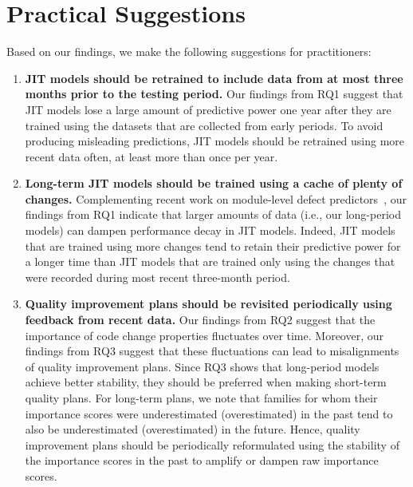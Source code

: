 \section{Practical Suggestions}
\label{sec:practice}

Based on our findings, we make the following suggestions for practitioners:

\begin{enumerate}[{\bf (1)}]
  \item {\bf JIT models should be retrained to include data from at most three months prior to the testing period.}
    Our findings from RQ1 suggest that JIT models lose a large amount of predictive power one year after they are trained using the datasets that are collected from early periods.
    To avoid producing misleading predictions, JIT models should be retrained using more recent data often, at least more than once per year.

 

  \item {\bf Long-term JIT models should be trained using a cache of plenty of changes.}
    Complementing recent work on module-level defect predictors~\cite{rahman2013fse}, our findings from RQ1 indicate that larger amounts of data (i.e., our long-period models) can dampen performance decay in JIT models.
    Indeed, JIT models that are trained using more changes tend to retain their predictive power for a longer time than JIT models that are trained only using the changes that were recorded during most recent three-month period.

  \item {\bf Quality improvement plans should be revisited periodically using feedback from recent data.}
    Our findings from RQ2 suggest that the importance of code change properties fluctuates over time.
    Moreover, our findings from RQ3 suggest that these fluctuations can lead to misalignments of quality improvement plans.
    Since RQ3 shows that long-period models achieve better stability, they should be preferred when making short-term quality plans.
    For long-term plans, we note that families for whom their importance scores were underestimated (overestimated) in the past tend to also be underestimated (overestimated) in the future.
    Hence, quality improvement plans should be periodically reformulated using the stability of the importance scores in the past to amplify or dampen raw importance scores.
\end{enumerate}
